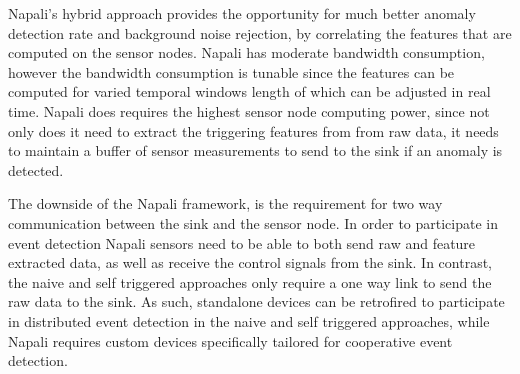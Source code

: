 Napali's hybrid approach provides the opportunity for much better anomaly detection rate and background noise rejection, by correlating the features that are computed on the sensor nodes. Napali has moderate bandwidth consumption, however the bandwidth consumption is tunable since the features can be computed for varied temporal windows length of which can be adjusted in real time. Napali does requires the highest sensor node computing power, since not only does it need to extract the triggering features from from raw data, it needs to maintain a buffer of sensor measurements to send to the sink if an anomaly is detected.

The downside of the Napali framework, is the requirement for two way communication between the sink and the sensor node. In order to participate in event detection Napali sensors need to be able to both send raw and feature extracted data, as well as receive the control signals from the sink. In contrast, the naive and self triggered approaches only require a one way link to send the raw data to the sink. As such, standalone devices can be retrofired to participate in distributed event detection in the naive and self triggered approaches, while Napali requires custom devices specifically tailored for cooperative event detection.

